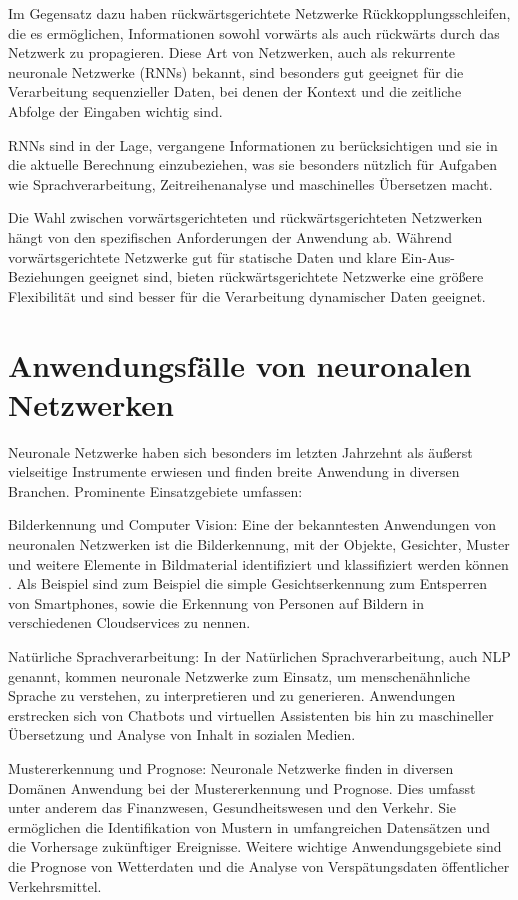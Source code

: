 Im Gegensatz dazu haben rückwärtsgerichtete Netzwerke Rückkopplungsschleifen, die es ermöglichen, Informationen sowohl vorwärts als auch rückwärts durch das Netzwerk zu propagieren. Diese Art von Netzwerken, auch als rekurrente neuronale Netzwerke (RNNs) bekannt, sind besonders gut geeignet für die Verarbeitung sequenzieller Daten, bei denen der Kontext und die zeitliche Abfolge der Eingaben wichtig sind.

RNNs sind in der Lage, vergangene Informationen zu berücksichtigen und sie in die aktuelle Berechnung einzubeziehen, was sie besonders nützlich für Aufgaben wie Sprachverarbeitung, Zeitreihenanalyse und maschinelles Übersetzen macht.

Die Wahl zwischen vorwärtsgerichteten und rückwärtsgerichteten Netzwerken hängt von den spezifischen Anforderungen der Anwendung ab. Während vorwärtsgerichtete Netzwerke gut für statische Daten und klare Ein-Aus-Beziehungen geeignet sind, bieten rückwärtsgerichtete Netzwerke eine größere Flexibilität und sind besser für die Verarbeitung dynamischer Daten geeignet.

\section{Anwendungsfälle von neuronalen Netzwerken}
\label{sec:Grundlagen_Anwendungsfälle}
Neuronale Netzwerke haben sich besonders im letzten Jahrzehnt als äußerst vielseitige Instrumente erwiesen und finden breite Anwendung in diversen Branchen. Prominente Einsatzgebiete umfassen:

Bilderkennung und Computer Vision: Eine der bekanntesten Anwendungen von neuronalen Netzwerken ist die Bilderkennung, mit der Objekte, Gesichter, Muster und weitere Elemente in Bildmaterial identifiziert und klassifiziert werden können \citep{LeCun_Deep_Learning}. Als Beispiel sind zum Beispiel die simple Gesichtserkennung zum Entsperren von Smartphones, sowie die Erkennung von Personen auf Bildern in verschiedenen Cloudservices zu nennen.

Natürliche Sprachverarbeitung: In der Natürlichen Sprachverarbeitung, auch NLP genannt, kommen neuronale Netzwerke zum Einsatz, um menschenähnliche Sprache zu verstehen, zu interpretieren und zu generieren. Anwendungen erstrecken sich von Chatbots und virtuellen Assistenten bis hin zu maschineller Übersetzung und Analyse von Inhalt in sozialen Medien.

Mustererkennung und Prognose: Neuronale Netzwerke finden in diversen Domänen Anwendung bei der Mustererkennung und Prognose. Dies umfasst unter anderem das Finanzwesen, Gesundheitswesen und den Verkehr. Sie ermöglichen die Identifikation von Mustern in umfangreichen Datensätzen und die Vorhersage zukünftiger Ereignisse. Weitere wichtige Anwendungsgebiete sind die Prognose von Wetterdaten und die Analyse von Verspätungsdaten öffentlicher Verkehrsmittel.

